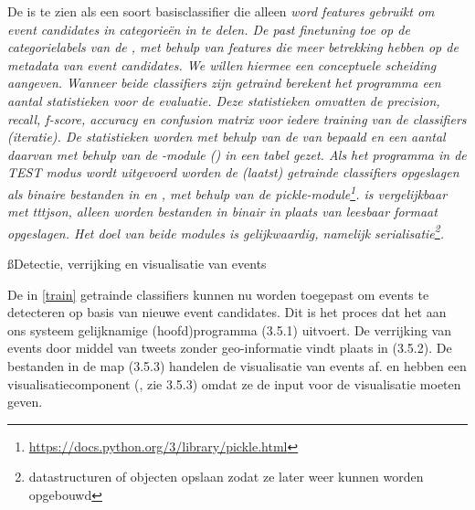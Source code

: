 {{De  is te zien als een soort basisclassifier die alleen \it{word 
features} gebruikt om event candidates in categorie\"en in te delen. De 
 past \it{finetuning} toe op de categorielabels van de 
, met behulp van features die meer betrekking hebben op de 
\it{metadata} van event candidates. We willen hiermee een conceptuele scheiding aangeven.
\vl
Wanneer beide classifiers zijn getraind berekent het programma een aantal 
statistieken voor de evaluatie. Deze statistieken omvatten de \it{precision}, \it{recall}, 
\it{f-score}, \it{accuracy} en \it{confusion matrix} voor iedere training van de classifiers 
(iteratie). De statistieken worden met behulp van de  van  bepaald en 
een aantal daarvan met behulp van de -module () 
in een tabel gezet.
\vl
Als het programma in de TEST modus wordt uitgevoerd worden de (laatst) getrainde 
classifiers opgeslagen als binaire bestanden in 
 en , 
met behulp van de pickle-module\footnote{\url{https://docs.python.org/3/library/pickle.html}}.
 is vergelijkbaar met ttt{json}, alleen worden bestanden in binair in plaats van
leesbaar formaat opgeslagen. Het doel van beide modules is gelijkwaardig, namelijk
\it{serialisatie}\footnote{datastructuren of objecten opslaan zodat ze later weer kunnen 
worden opgebouwd}.

\ss{Detectie, verrijking en visualisatie van events}\label{detect}

De in \ref{train} getrainde classifiers kunnen nu worden toegepast om events te 
detecteren op basis van nieuwe event candidates. Dit is het proces dat het aan 
ons systeem gelijknamige (hoofd)programma  (3.5.1) uitvoert. De 
verrijking van events door middel van tweets zonder geo-informatie vindt plaats 
in  (3.5.2). De bestanden in de map  (3.5.3) handelen 
de visualisatie van events af.  en  hebben een 
visualisatiecomponent (, zie 3.5.3) omdat ze de input voor de 
visualisatie moeten geven.

\label{EventDetective}

}}
